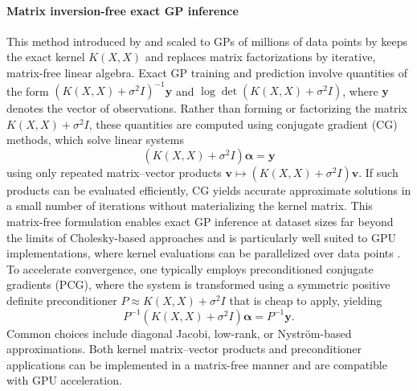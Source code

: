 \documentclass[11pt,a4paper]{article}
\newcommand{\by}{\boldsymbol{y}}
\begin{document}
\paragraph{Matrix inversion-free exact GP inference} This method introduced by \cite{Gardner2018GPyTorchBM} and scaled to GPs of millions of data points by \cite{pcg} keeps the exact kernel $K(X,X)$ and replaces matrix factorizations by iterative,
matrix-free linear algebra.
Exact GP training and prediction involve quantities of the form $(K(X,X)+\sigma^2 I)^{-1}\by$ and $\log\det(K(X,X)+\sigma^2 I)$,
where $\by$ denotes the vector of observations.
Rather than forming or factorizing the matrix $K(X,X)+\sigma^2 I$, these quantities are computed using conjugate gradient (CG)
methods, which solve linear systems
\begin{displaymath}(K(X,X)+\sigma^2 I)\boldsymbol{\alpha} = \by\end{displaymath}
using only repeated matrix--vector products $\boldsymbol{v}\mapsto (K(X,X)+\sigma^2 I)\boldsymbol{v}$.
If such products can be evaluated efficiently, CG yields accurate approximate solutions in a small number of iterations without materializing the kernel matrix.
This matrix-free formulation enables exact GP inference at dataset sizes far beyond the limits of Cholesky-based approaches and is
particularly well suited to GPU implementations, where kernel evaluations can be parallelized over data points
\citep{Gardner2018GPyTorchBM}. To accelerate convergence, one typically employs preconditioned conjugate gradients (PCG), where the system is transformed using a
symmetric positive definite preconditioner $P\approx K(X,X)+\sigma^2 I$ that is cheap to apply, yielding
\begin{displaymath}P^{-1}(K(X,X)+\sigma^2 I)\boldsymbol{\alpha} = P^{-1}\by.\end{displaymath}
Common choices include diagonal Jacobi, low-rank, or Nyström-based approximations.
Both kernel matrix--vector products and preconditioner applications can be implemented in a matrix-free manner and are compatible
with GPU acceleration.
\end{document}
